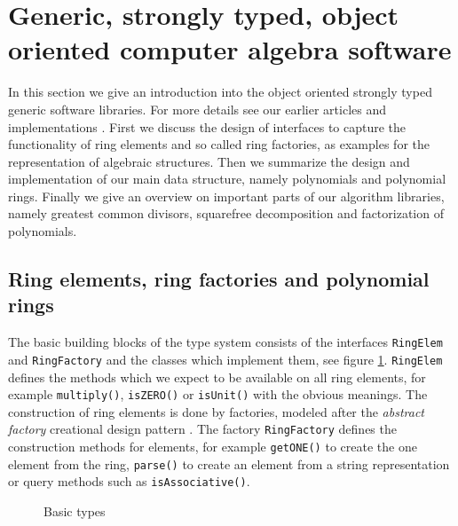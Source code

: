 \documentclass{llncs}
\newcommand{\code}[1]{\texttt{#1}}
\begin{document}
\section{Generic, strongly typed, object oriented computer algebra software} %
\label{sec:asto}

In this section we give an introduction into the object oriented
strongly typed generic software libraries. For more details see our
earlier articles and implementations
\cite{JollyKredel:2009,JollyKredel:2010,Jolly:2010,Kredel:2011,Kredel:2008}. %
%
First we discuss the design of interfaces to capture the functionality
of ring elements and so called ring factories, as examples for the
representation of algebraic structures. Then we summarize the design
and implementation of our main data structure, namely polynomials and
polynomial rings. Finally we give an overview on important parts of
our algorithm libraries, namely greatest common divisors, squarefree
decomposition and factorization of polynomials.


\subsection{Ring elements, ring factories and polynomial rings} %
\label{sec:ring}

The basic building blocks of the type system consists of the
interfaces \code{RingElem} and \code{RingFactory} and the classes
which implement them, see figure \ref{fig:bastype}. \code{RingElem}
defines the methods which we expect to be available on all ring
elements, for example \code{multiply()},
\code{isZERO()} or \code{isUnit()} with the obvious meanings. The
construction of ring elements is done by factories, modeled after the
{\em abstract factory} creational design pattern \cite{Gamma:1995}.
The factory \code{RingFactory} defines the construction methods for
elements, for example \code{get\-ONE()} to create the one element from
the ring, 
\code{parse()} to create an element from a string representation or query methods such as
\code{is\-Asso\-ciative()}. %

\begin{figure}[thb]
\centering
{}
\caption{Basic types}
\label{fig:bastype}
\end{figure}
\end{document}
